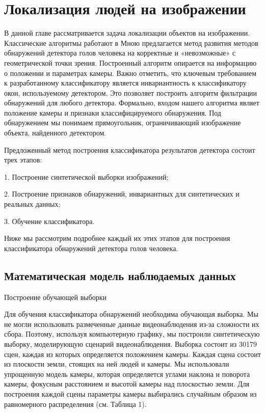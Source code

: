 
\chapter{Локализация людей на изображении} \label{chapt3}

В данной главе рассматривается задача локализации объектов на изображении. Классические алгоритмы работают в  Мною предлагается метод развития методов  обнаружений детектора голов человека на корректные и «невозможные» с геометрической точки зрения. Построенный алгоритм опирается на информацию о положении и параметрах камеры. Важно отметить, что ключевым требованием к разработанному классификатору является инвариантность к классификатору окон, используемому детектором. Это позволяет построить алгоритм фильтрации обнаружений для любого детектора. Формально, входом нашего алгоритма являет положение камеры и признаки классифицируемого обнаружения. Под обнаружением мы понимаем прямоугольник, ограничивающий изображение объекта, найденного детектором.

Предложенный метод построения классификатора результатов детектора состоит трех этапов:

1. Построение синтетической выборки изображений;

2. Построение признаков обнаружений, инвариантных для синтетических и реальных данных;

3. Обучение классификатора.

Ниже мы рассмотрим подробнее каждый их этих этапов для построения классификатора обнаружений детектора голов человека.

\section{Математическая модель наблюдаемых данных}

Построение обучающей выборки

Для обучения классификатора обнаружений необходима обучающая выборка. Мы не могли использовать размеченные данные видеонаблюдения из-за сложности их сбора. Поэтому, используя компьютерную графику, мы построили синтетическую выборку, моделирующую сценарий видеонаблюдения. Выборка состоит из 30179 сцен, каждая из которых определяется положением камеры. Каждая сцена состоит из плоскости земли, стоящих на ней людей и камеры. Мы использовали упрощенную модель камеры, которая определяется углами наклона и поворота камеры, фокусным расстоянием и высотой камеры над плоскостью земли. Для построения каждой сцены параметры камеры выбирались случайным образом из равномерного распределения (см. Таблица 1).

